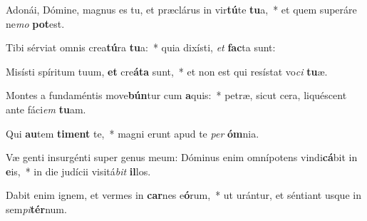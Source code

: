 \item Adonái, Dómine, magnus es tu, et præclárus in vir\textbf{tú}te \textbf{tu}a,~* et quem superáre ne\textit{mo} \textbf{pot}est.
\item Tibi sérviat omnis crea\textbf{tú}ra \textbf{tu}a:~* quia dixísti, \textit{et} \textbf{fac}ta sunt:
\item Misísti spíritum tuum, \textbf{et} cre\textbf{á}\textbf{ta} sunt,~* et non est qui resístat vo\textit{ci} \textbf{tu}æ.
\item Montes a fundaméntis move\textbf{bún}tur cum \textbf{a}quis:~* petræ, sicut cera, liquéscent ante fáci\textit{em} \textbf{tu}am.
\item Qui \textbf{au}tem \textbf{ti}\textbf{ment} te,~* magni erunt apud te \textit{per} \textbf{óm}nia.
\item Væ genti insurgénti super genus meum: Dóminus enim omnípotens vindi\textbf{cá}bit in \textbf{e}is,~* in die judícii visitá\textit{bit} \textbf{il}los.
\item Dabit enim ignem, et vermes in \textbf{car}nes e\textbf{ó}rum,~* ut urántur, et séntiant usque in sem\textit{pi}\textbf{tér}num.
